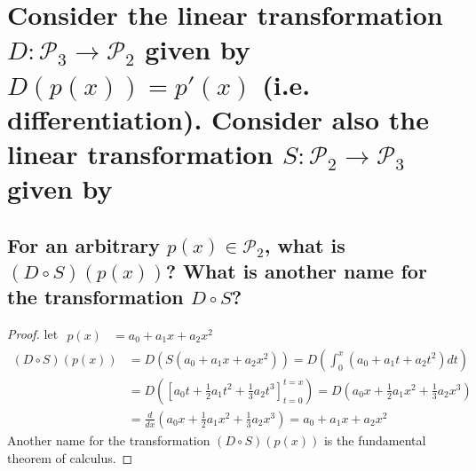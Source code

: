 \documentclass[../main.tex]{subfiles}
\begin{document}
\section[Problem 4]{Consider the linear transformation $D: \mathcal{P}_3 \to \mathcal{P}_2$ given by $D(p(x)) = p'(x)$ (i.e. differentiation). Consider also the linear transformation $S: \mathcal{P}_2 \to \mathcal{P}_3$ given by }
\subsection{For an arbitrary $p(x) \in \mathcal{P}_2$, what is $(D \circ S)(p(x))$? What is another name for the transformation $D \circ S$?}
\begin{proof}
        let $\displaystyle \begin{aligned}
                        p( x) & =a_{0} +a_{1} x+a_{2} x^{2}
                \end{aligned}$
        \begin{align*}
                ( D\circ S)( p( x)) & =D\left( S\left( a_{0} +a_{1} x+a_{2} x^{2}\right)\right) =D\left(\int _{0}^{x}\left( a_{0} +a_{1} t+a_{2} t^{2}\right) dt\right)                                          \\
                                    & =D\left(\left[ a_{0} t+\frac{1}{2} a_{1} t^{2} +\frac{1}{3} a_{2} t^{3}\right]_{t=0}^{t=x}\right) =D\left( a_{0} x+\frac{1}{2} a_{1} x^{2} +\frac{1}{3} a_{2} x^{3}\right) \\
                                    & =\frac{d}{dx}\left( a_{0} x+\frac{1}{2} a_{1} x^{2} +\frac{1}{3} a_{2} x^{3}\right) =a_{0} +a_{1} x+a_{2} x^{2}
        \end{align*}
        Another name for the transformation $\displaystyle ( D\circ S)( p( x))$ is the fundamental theorem of calculus.
\end{proof}
\end{document}
